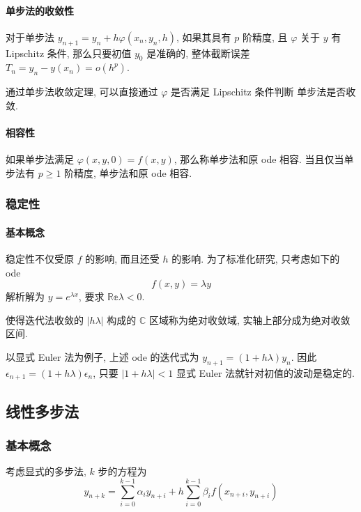 \documentclass{ctexart}
\newcommand{\Cset}{\mathbb{C}}
\begin{document}
\paragraph{单步法的收敛性}
    对于单步法 $y_{n+1} = y_n + h \varphi(x_n, y_n, h)$, 如果其具有 $p$ 阶精度,
    且 $\varphi$ 关于 $y$ 有 Lipschitz 条件, 那么只要初值 $y_0$ 是准确的, 
    整体截断误差 $T_{n} = y_n - y(x_n) = o(h^p)$.\par
    通过单步法收敛定理, 可以直接通过 $\varphi$ 是否满足 Lipschitz 条件判断
    单步法是否收敛.
\paragraph{相容性}
    如果单步法满足 $\varphi(x, y, 0) = f(x, y)$, 那么称单步法和原 ode 相容.
    当且仅当单步法有 $p \ge 1$ 阶精度, 单步法和原 ode 相容.
\subsubsection{稳定性}
\paragraph{基本概念}
    稳定性不仅受原 $f$ 的影响, 而且还受 $h$ 的影响. 为了标准化研究, 只考虑如下的 ode \[
        f(x, y) = \lambda y\]
    解析解为 $y = e^{\lambda x}$, 要求 $\mathbb{Re} \lambda < 0$.\par
    使得迭代法收敛的 $|h\lambda|$ 构成的 $\Cset$ 区域称为绝对收敛域, 实轴上部分成为绝对收敛区间.\par
    以显式 Euler 法为例子, 上述 ode 的迭代式为 $y_{n+1} = (1+h\lambda) y_n$.
    因此 $\epsilon_{n+1} = (1 + h\lambda) \epsilon_{n}$, 只要 $|1 + h\lambda| < 1$
    显式 Euler 法就针对初值的波动是稳定的.\par

\subsection{线性多步法}
\subsubsection{基本概念}
    考虑显式的多步法, $k$ 步的方程为 \[
        y_{n+k} = \sum_{i=0}^{k-1} \alpha_i y_{n+i} + h \sum_{i=0}^{k-1} \beta_i f(x_{n+i}, y_{n+i})\]
\end{document}
